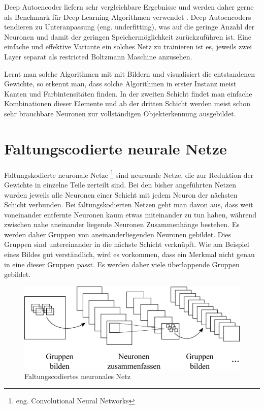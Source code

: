 Deep Autoencoder liefern sehr vergleichbare Ergebnisse und werden daher gerne als Benchmark für Deep Learning-Algorithmen verwendet \citep{AutoencoderBenchmark}. Deep Autoencoders tendieren zu Unteranpassung (eng. underfitting), was auf die geringe Anzahl der Neuronen und damit der geringen Speichermöglichkeit zurückzuführen ist. Eine einfache und effektive Variante ein solches Netz zu trainieren ist es, jeweils zwei Layer separat als restricted Boltzmann Maschine anzusehen.

Lernt man solche Algorithmen mit mit Bildern und visualisiert die entstandenen Gewichte, so erkennt man, dass solche Algorithmen in erster Instanz meist Kanten und Farbintensitäten finden. In der zweiten Schicht findet man einfache Kombinationen dieser Elemente und ab der dritten Schicht werden meist schon sehr brauchbare Neuronen zur vollständigen Objekterkennung ausgebildet.

\section{Faltungscodierte neurale Netze}

Faltungskodierte neuronale Netze \footnote{eng. Convolutional Neural Networks} sind neuronale Netze, die zur Reduktion der Gewichte in einzelne Teile zerteilt sind. Bei den bisher angeführten Netzen wurden jeweils alle Neuronen einer Schicht mit jedem Neuron der nächsten Schicht verbunden. Bei faltungskodierten Netzen geht man davon aus, dass weit voneinander entfernte Neuronen kaum etwas miteinander zu tun haben, während zwischen nahe aneinander liegende Neuronen Zusammenhänge bestehen. Es werden daher Gruppen von aneinanderliegenden Neuronen gebildet. Dies Gruppen sind untereinander in die nächste Schicht verknüpft. Wie am Beispiel eines Bildes gut verständlich, wird es vorkommen, dass ein Merkmal nicht genau in eine dieser Gruppen passt. Es werden daher viele überlappende Gruppen gebildet.

\begin{figure}
	\centering
	\includegraphics[scale=1]{images/convolution.png}
	\caption{Faltungscodiertes neuronales Netz}
	\label{fig:convolution}
\end{figure}

